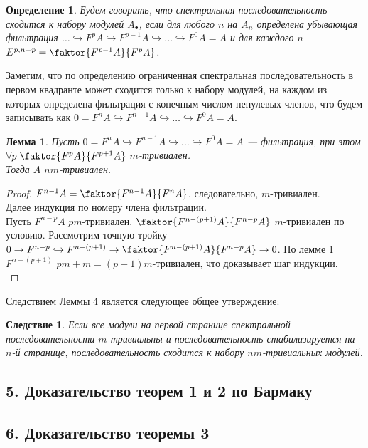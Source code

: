 \documentclass[a4paper,12pt]{report}
\newtheorem{lemma}{Лемма}
\newtheorem{corollary}{Следствие}
\newtheorem{definition}{Определение}
\begin{document}
\begin{definition}
  Будем говорить, что спектральная последовательность сходится к набору модулей $A_{\bullet}$,
  если для любого $n$ на $A_n$ определена убывающая фильтрация $\ldots \hookrightarrow  F^pA \hookrightarrow F^{p-1}A \hookrightarrow \ldots \hookrightarrow F^0A = A$ и для каждого $n$ $E^{p,n-p} = \faktor{F^{p-1}A}{F^pA}$.
\end{definition}

Заметим, что по определению ограниченная спектральная последовательность в первом квадранте может сходится только к набору модулей, на каждом из которых определена фильтрация с конечным числом ненулевых членов, что будем записывать как $0 = F^nA \hookrightarrow F^{n-1}A \hookrightarrow \ldots \hookrightarrow F^0A = A$.

\begin{lemma}
  Пусть $0 = F^nA \hookrightarrow F^{n-1}A \hookrightarrow \ldots \hookrightarrow F^0A = A$ --- фильтрация, при этом $\forall p\; \faktor{F^pA}{F^{p+1}A}$ $m$-тривиален.\\
  Тогда $A$ $nm$-тривиален.
\end{lemma}

\begin{proof}
  $F^{n-1}A = \faktor{F^{n-1}A}{F^nA}$, следовательно, $m$-тривиален.\\
  Далее индукция по номеру члена фильтрации.\\
  Пусть $F^{n-p}A$ $pm$-тривиален. $\faktor{F^{n-(p+1)}A}{F^{n-p}A}$ $m$-тривиален по условию. Рассмотрим точную тройку $0 \to F^{n-p} \hookrightarrow F^{n-(p+1)} \rightarrow \faktor{F^{n-(p+1)}A}{F^{n-p}A} \to 0$. По лемме 1 $F^{n-(p+1)}$ $pm+m=(p+1)m$-тривиален, что доказывает шаг индукции.\\
\end{proof}

Следствием Леммы 4 является следующее общее утверждение:
\begin{corollary}
  Если все модули на первой странице спектральной последовательности $m$-тривиальны и последовательность стабилизируется на $n$-й странице, последовательность сходится к набору $nm$-тривиальных модулей.
\end{corollary}

\subsection*{5. Доказательство теорем 1 и 2 по Бармаку}

\subsection*{6. Доказательство теоремы 3}
\end{document}
